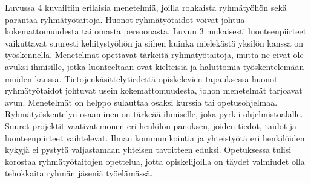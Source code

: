 \documentclass[finnish]{../tktltiki2}
\theoremstyle{definition}
\theoremstyle{remark}
\begin{document}
Luvussa 4 kuvailtiin erilaisia menetelmiä, joilla rohkaista ryhmätyöhön sekä parantaa ryhmätyötaitoja. Huonot ryhmätyötaidot voivat johtua kokemattomuudesta tai omasta persoonasta. Luvun 3 mukaisesti luonteenpiirteet vaikuttavat suuresti kehitystyöhön ja siihen kuinka mielekästä yksilön kanssa on työskennellä. Menetelmät opettavat tärkeitä ryhmätyötaitoja, mutta ne eivät ole avuksi ihmisille, jotka luonteeltaan ovat kielteisiä ja haluttomia työskentelemään muiden kanssa. Tietojenkäsittelytiedettä opiskelevien tapauksessa huonot ryhmätyötaidot johtuvat usein kokemattomuudesta, johon menetelmät tarjoavat avun. Menetelmät on helppo sulauttaa osaksi kurssia tai opetusohjelmaa.\\

Ryhmätyöskentelyn osaaminen on tärkeää ihmiselle, joka pyrkii ohjelmistoalalle. Suuret projektit vaativat monen eri henkilön panoksen, joiden tiedot, taidot ja luonteenpiirteet vaihtelevat. Ilman kommunikointia ja yhteistyötä eri henkilöiden kykyjä ei pystytä valjastamaan yhteisen tavoitteen eduksi. Opetuksessa tulisi korostaa ryhmätyötaitojen opettelua, jotta opiskelijoilla on täydet valmiudet olla tehokkaita ryhmän jäseniä työelämässä.


%
%
% 
%



\end{document}
